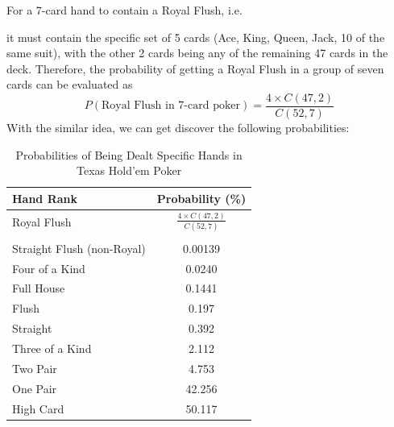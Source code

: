 \documentclass{article}
\begin{document}
For a 7-card hand to contain a Royal Flush, i.e.
\begin{center}
\end{center}
it must contain the specific set of 5 cards 
(Ace, King, Queen, Jack, 10 of the same suit), 
with the other 2 cards being any of the remaining 47 cards in the deck. 
Therefore, the probability of getting a Royal Flush in a group of seven 
cards can be evaluated as 
\[
P(\text{Royal Flush in 7-card poker}) = \frac{4 \times C(47, 2)}{C(52, 7)}
\]
With the similar idea, we can get discover the following probabilities:
\begin{table}[ht]
    \centering
    \caption{Probabilities of Being Dealt Specific Hands in Texas Hold'em Poker}
    \label{tab:poker_hands}
    \begin{tabularx}{\textwidth}{@{}Xc@{}} %
    \toprule
    Hand Rank                  & Probability (\%) \\ \midrule
    Royal Flush                & $\displaystyle \frac{4 \times C(47, 2)}{C(52, 7)}$       \\
    \vspace*{0.5mm} & \vspace*{1mm} \\
    Straight Flush (non-Royal) & 0.00139          \\
    Four of a Kind             & 0.0240           \\
    Full House                 & 0.1441           \\
    Flush                      & 0.197            \\
    Straight                   & 0.392            \\
    Three of a Kind            & 2.112            \\
    Two Pair                   & 4.753            \\
    One Pair                   & 42.256           \\
    High Card                  & 50.117           \\ \bottomrule
    \end{tabularx}
\end{table}
\end{document}
